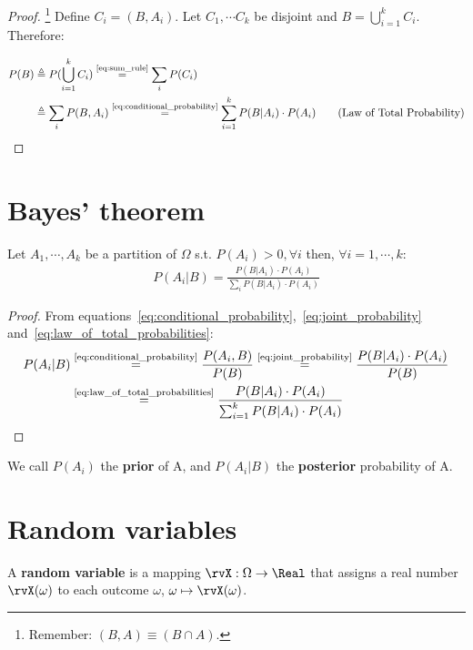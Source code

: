 \begin{proof}
\footnote{Remember: \((B, A) \equiv (B \cap A)\).}
Define \(C_i = (B,A_i)\). Let \(C_1, \cdots C_k\) be disjoint and \(B = \bigcup\limits_{i=1}^k C_i\). \\
Therefore:

	\begin{align}
		P(B) &\triangleq P(\bigcup\limits_{i=1}^k C_i)
		\overset{\text{\ref{eq:sum_rule}}}{=} \sum_i P(C_i)\\
		&\triangleq \sum_i P(B,A_i)
		\overset{\text{\ref{eq:conditional_probability}}}{=} \sum_{i=1}^k P(B|A_i)\cdot P(A_i) \tag{Law of Total Probability}
	\end{align}
\end{proof}
\section{Bayes' theorem}\label{sec:bayes_theorem}
\begin{theorem}
	Let \(A_1, \cdots, A_k\) be a partition of \(\Omega\) s.t. \(P(A_i)>0, \forall i\) then, \(\forall i=1, \cdots, k\):
	\begin{align}
		P(A_i|B)= \frac{P(B|A_i)\cdot P(A_i)}{\sum_i P(B|A_i)\cdot P(A_i)} \tag{Bayes' theorem}
	\end{align}
\end{theorem}
\begin{proof}
	From equations~\ref{eq:conditional_probability},~\ref{eq:joint_probability} and~\ref{eq:law_of_total_probabilities}:
	\begin{align}
		P(A_i|B)&\overset{\text{\ref{eq:conditional_probability}}}{=}\frac{P(A_i,B)}{P(B)} \overset{\text{\ref{eq:joint_probability}}}{=} \frac{P(B|A_i) \cdot P(A_i)}{P(B)}  \\
		&\overset{\text{\ref{eq:law_of_total_probabilities}}}{=}\frac{P(B|A_i)\cdot P(A_i)}{\sum_{i=1}^k P(B|A_i)\cdot P(A_i)}
	\end{align}
\end{proof}
We call \(P(A_i)\) the \textbf{prior} of A, and \(P(A_i|B)\) the \textbf{posterior} probability of A.
\section{Random variables}\label{sec:random_variables}
\begin{definition}
	A \textbf{random variable} is a mapping \(\rvX:\Omega \to \Real\) that assigns a real number \(\rvX(\omega)\) to each outcome \(\omega\), \(\omega \mapsto \rvX(\omega)\).
\end{definition}

